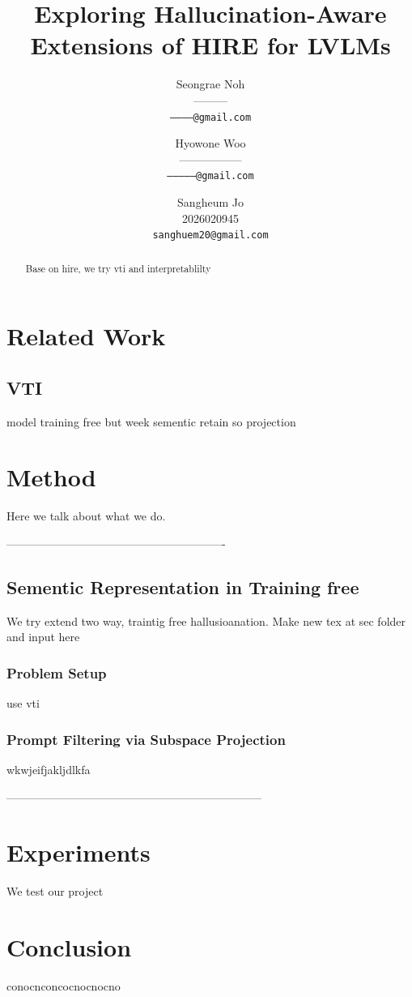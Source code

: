 \documentclass[10pt,twocolumn,letterpaper]{article}
\title{Exploring Hallucination-Aware Extensions of HIRE for LVLMs}
\author{Seongrae Noh\\
---------\\
{\tt\small -----------@gmail.com}
\and
Hyowone Woo\\
-----------------\\
{\tt\small ---------------@gmail.com}
\and
Sangheum Jo\\
2026020945\\
{\tt\small sanghuem20@gmail.com}
}
\begin{document}
\maketitle
\begin{abstract}
Base on hire, we try vti and interpretablilty
\end{abstract}   




\section{Related Work}



\subsection{VTI}
model training free but week sementic retain so projection




\section{Method}
Here we talk about what we do.

----------------------------------------------------------
\subsection{Sementic Representation in Training free}

We try extend two way, traintig free hallusioanation. Make new tex at sec folder and input here

\subsubsection{Problem Setup}

use vti

\subsubsection{Prompt Filtering via Subspace Projection}

wkwjeifjakljdlkfa

--------------------------------------------------------------------



\section{Experiments}

We test our project



\section{Conclusion}

conocnconcocnocnocno

{\small


} 


% 
\end{document}
